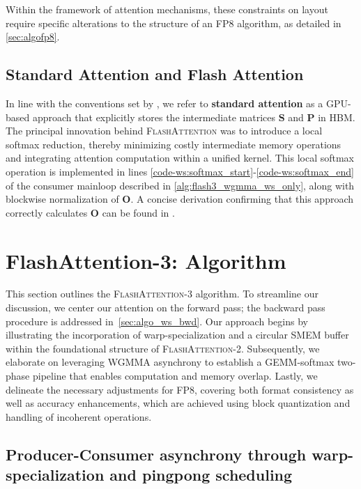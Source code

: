Within the framework of attention mechanisms, these constraints on layout require specific alterations to the structure of an FP8 algorithm, as detailed in \cref{sec:algofp8}.

\subsection{Standard Attention and Flash Attention} In line with the conventions set by \citet{dao2022flashattention}, we refer to \textbf{standard attention} as a GPU-based approach that explicitly stores the intermediate matrices $\mathbf{S}$ and $\mathbf{P}$ in HBM. The principal innovation behind \textsc{FlashAttention} was to introduce a local softmax reduction, thereby minimizing costly intermediate memory operations and integrating attention computation within a unified kernel. This local softmax operation is implemented in lines \ref{code-ws:softmax_start}-\ref{code-ws:softmax_end} of the consumer mainloop described in \cref{alg:flash3_wgmma_ws_only}, along with blockwise normalization of $\mathbf{O}$. A concise derivation confirming that this approach correctly calculates $\mathbf{O}$ can be found in \cite[\S 2.3.1]{dao2023flashattention2}.

\section{FlashAttention-3: Algorithm}
\label{sec:algo}

This section outlines the \textsc{FlashAttention-3} algorithm. To streamline our discussion, we center our attention on the forward pass; the backward pass procedure is addressed in~\cref{sec:algo_ws_bwd}. Our approach begins by illustrating the incorporation of warp-specialization and a circular SMEM buffer within the foundational structure of \textsc{FlashAttention-2}. Subsequently, we elaborate on leveraging WGMMA asynchrony to establish a GEMM-softmax two-phase pipeline that enables computation and memory overlap. Lastly, we delineate the necessary adjustments for FP8, covering both format consistency as well as accuracy enhancements, which are achieved using block quantization and handling of incoherent operations.

\subsection{Producer-Consumer asynchrony through warp-specialization and pingpong scheduling}
\label{sec:algo_ws}

